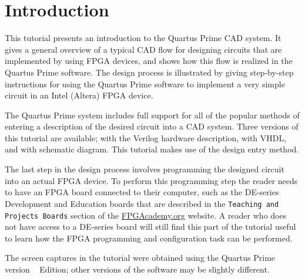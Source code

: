 \section{Introduction}


This tutorial presents an introduction to the Quartus\textsuperscript{\textregistered} Prime 
CAD system.  It gives a general overview of a typical CAD flow for designing circuits that are
implemented by using FPGA devices, and shows how this flow is realized in
the Quartus Prime software. The design process is illustrated by giving step-by-step
instructions for using the Quartus Prime software to implement a very simple circuit
in an Intel\textsuperscript{\textregistered} (Altera) FPGA device.

The Quartus Prime system includes full support for all of the popular methods of
entering a description of the desired circuit into a CAD system. 
Three versions of this tutorial are available; with the Verilog hardware description, with VHDL, 
and with schematic diagram.  This tutorial makes use of the \typeName{} design entry method.  

The last step in the design process involves programming the designed circuit
into an actual FPGA device. To perform this programming step the reader needs to have an FPGA
board connected to their computer, such as the DE-series Development and Education boards that
are described in the \texttt{Teaching and Projects Boards} 
section of the {\small \href{https://www.fpgacademy.org/boards.html} {FPGAcademy.org}} website. 
A reader who does not have access to a DE-series board will still find this part of the
tutorial useful to learn how the FPGA programming and configuration task can be performed.

The screen captures in the tutorial were obtained using the 
Quartus Prime version \versnum \ \edition{} Edition; other versions of the software may be slightly different.

